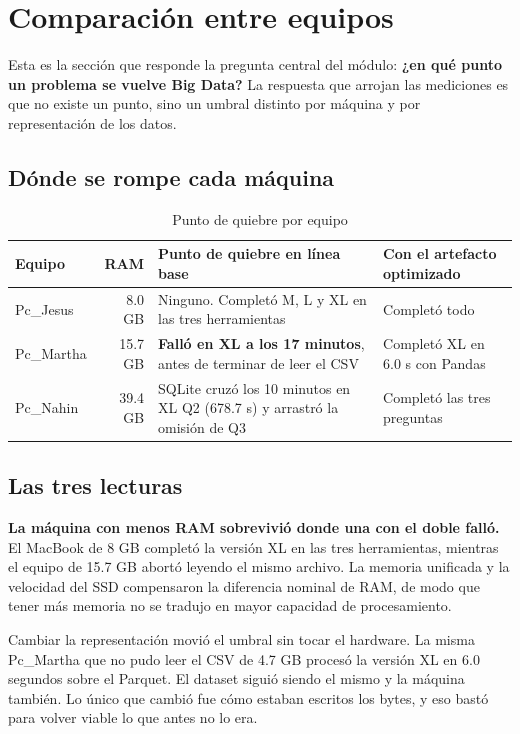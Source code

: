 \section{Comparación entre equipos}

Esta es la sección que responde la pregunta central del módulo: \textbf{¿en qué punto un problema se vuelve Big Data?} La respuesta que arrojan las mediciones es que no existe un punto, sino un umbral distinto por máquina y por representación de los datos.

\subsection{Dónde se rompe cada máquina}

\begin{table}[htbp]
\centering
\footnotesize
\caption{Punto de quiebre por equipo}
\label{tab:quiebre}
\begin{tabularx}{\textwidth}{lrXX}
\toprule
Equipo & RAM & Punto de quiebre en línea base & Con el artefacto optimizado \\
\midrule
Pc\_Jesus  & 8.0 GB & Ninguno. Completó M, L y XL en las tres herramientas & Completó todo \\
Pc\_Martha & 15.7 GB & \textbf{Falló en XL a los 17 minutos}, antes de terminar de leer el CSV & Completó XL en 6.0 s con Pandas \\
Pc\_Nahin  & 39.4 GB & SQLite cruzó los 10 minutos en XL Q2 (678.7 s) y arrastró la omisión de Q3 & Completó las tres preguntas \\
\bottomrule
\end{tabularx}
\end{table}

\subsection{Las tres lecturas}

\textbf{La máquina con menos RAM sobrevivió donde una con el doble falló.} El MacBook de 8 GB completó la versión XL en las tres herramientas, mientras el equipo de 15.7 GB abortó leyendo el mismo archivo. La memoria unificada y la velocidad del SSD compensaron la diferencia nominal de RAM, de modo que tener más memoria no se tradujo en mayor capacidad de procesamiento.

Cambiar la representación movió el umbral sin tocar el hardware. La misma Pc\_Martha que no pudo leer el CSV de 4.7 GB procesó la versión XL en 6.0 segundos sobre el Parquet. El dataset siguió siendo el mismo y la máquina también. Lo único que cambió fue cómo estaban escritos los bytes, y eso bastó para volver viable lo que antes no lo era.

